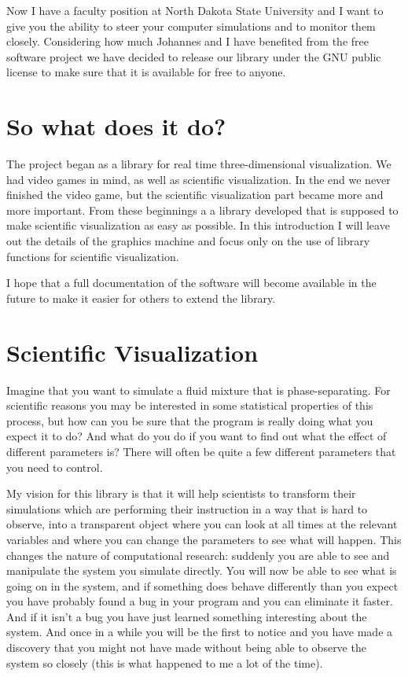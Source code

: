 \documentclass[12pt,letterpaper]{article}
\begin{document}
Now I have a faculty position at North Dakota State University and I
want to give you the ability to steer your computer simulations and to
monitor them closely. Considering how much Johannes and I have
benefited from the free software project we have decided to release
our library under the GNU public license to make sure that it is
available for free to anyone.

\section{So what does it do?}
The project began as a library for real time three-dimensional
visualization. We had video games in mind, as well as scientific
visualization. In the end we never finished the video game, but the
scientific visualization part became more and more important. From
these beginnings a a library developed that is supposed to make
scientific visualization as easy as possible. In this introduction I
will leave out the details of the graphics machine and focus only on
the use of library functions for scientific visualization.

I hope that a full documentation of the software will become available
in the future to make it easier for others to extend the library.

\section{Scientific Visualization}
Imagine that you want to simulate a fluid mixture that is
phase-separating. For scientific reasons you may be interested in some
statistical properties of this process, but how can you be sure that
the program is really doing what you expect it to do? And what do you
do if you want to find out what the effect of different parameters is?
There will often be quite a few different parameters that you need to
control. 

My vision for this library is that it will help scientists to
transform their simulations which are performing their instruction in
a way that is hard to observe, into a transparent object where you can
look at all times at the relevant variables and where you can change
the parameters to see what will happen. This changes the nature of
computational research: suddenly you are able to see and manipulate
the system you simulate directly. You will now be able to see what is
going on in the system, and if something does behave differently than
you expect you have probably found a bug in your program and you can
eliminate it faster. And if it isn't a bug you have just learned
something interesting about the system. And once in a while you will
be the first to notice and you have made a discovery that you might
not have made without being able to observe the system so
closely (this is what happened to me a lot of the time).
\end{document}
